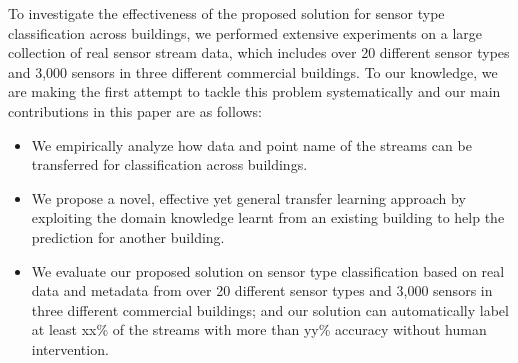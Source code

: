 To investigate the effectiveness of the proposed solution for sensor type 
classification across buildings, we performed extensive experiments on a large 
collection of real sensor stream data, which includes over 20 different sensor types 
and 3,000 sensors in three different commercial buildings. To our knowledge, we are 
making the first attempt to tackle this problem systematically and our main 
contributions in this paper are as follows:

\begin{itemize}\itemsep1pt \parskip1pt 
\item We empirically analyze how data and point name of the streams can be transferred for classification across buildings.
\item We propose a novel, effective yet general transfer learning approach by exploiting the domain knowledge learnt from an existing building to help the prediction for another building.
\item We evaluate our proposed solution on sensor type classification based on real data and metadata from over 20 different sensor types and 3,000 sensors in three different commercial buildings; and our solution can automatically label at least xx\% of the streams with more than yy\% accuracy without human intervention.
\end{itemize}